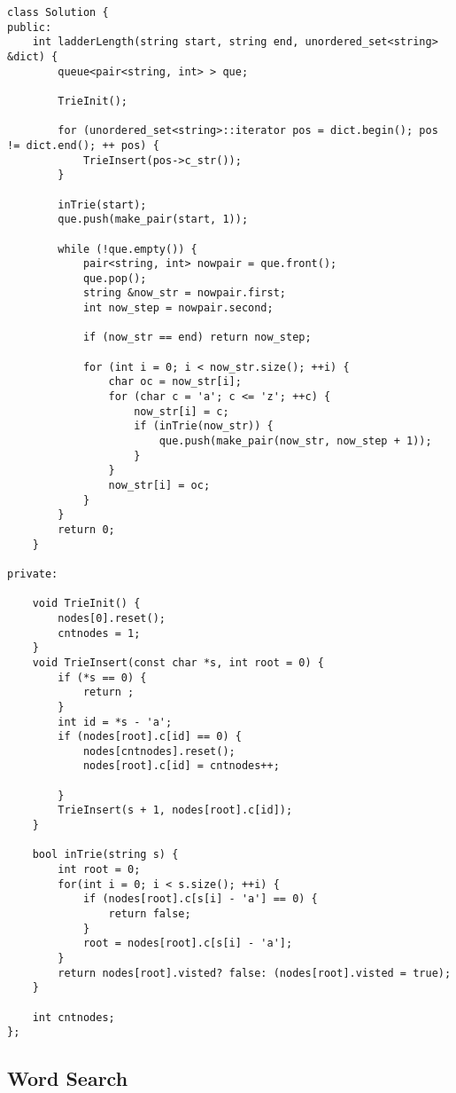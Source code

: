 \documentclass{article}
\begin{document}
\begin{CJK*}{UTF8}{gkai}
\begin{lstlisting}
class Solution {
public:
    int ladderLength(string start, string end, unordered_set<string> &dict) {
        queue<pair<string, int> > que;
        
        TrieInit();
        
        for (unordered_set<string>::iterator pos = dict.begin(); pos != dict.end(); ++ pos) {
            TrieInsert(pos->c_str());
        }
        
        inTrie(start);
        que.push(make_pair(start, 1));
        
        while (!que.empty()) {
            pair<string, int> nowpair = que.front();
            que.pop();
            string &now_str = nowpair.first;
            int now_step = nowpair.second;
            
            if (now_str == end) return now_step;
            
            for (int i = 0; i < now_str.size(); ++i) {
                char oc = now_str[i];
                for (char c = 'a'; c <= 'z'; ++c) {
                    now_str[i] = c;
                    if (inTrie(now_str)) {
                        que.push(make_pair(now_str, now_step + 1));
                    }
                }
                now_str[i] = oc;
            }
        }
        return 0;
    }
    
private:
    
    void TrieInit() {
        nodes[0].reset();
        cntnodes = 1;
    }
    void TrieInsert(const char *s, int root = 0) {
        if (*s == 0) {
            return ;
        }
        int id = *s - 'a';
        if (nodes[root].c[id] == 0) {
            nodes[cntnodes].reset();
            nodes[root].c[id] = cntnodes++;
            
        }
        TrieInsert(s + 1, nodes[root].c[id]);
    }
    
    bool inTrie(string s) {
        int root = 0;
        for(int i = 0; i < s.size(); ++i) {
            if (nodes[root].c[s[i] - 'a'] == 0) {
                return false;
            }
            root = nodes[root].c[s[i] - 'a'];
        }
        return nodes[root].visted? false: (nodes[root].visted = true);
    }
    
    int cntnodes;
};

\end{lstlisting}


\subsection{ Word Search }
\label{ Word Search }


\end{CJK*}
\end{document}
